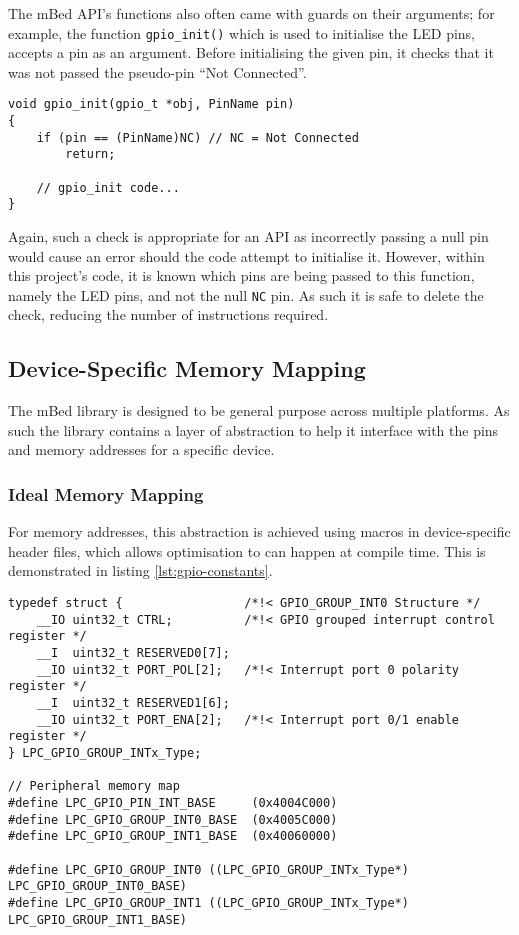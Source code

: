 The mBed API's functions also often came with guards on their arguments; for example, the function \verb|gpio_init()| which is used to initialise the LED pins, accepts a pin as an argument. Before initialising the given pin, it checks that it was not passed the pseudo-pin ``Not Connected''.

\begin{lstlisting}[caption={Argument Guards of gpio init}]
void gpio_init(gpio_t *obj, PinName pin)
{
    if (pin == (PinName)NC) // NC = Not Connected
        return;

    // gpio_init code...
}
\end{lstlisting}

Again, such a check is appropriate for an API as incorrectly passing a null pin would cause an error should the code attempt to initialise it. However, within this project's code, it is known which pins are being passed to this function, namely the LED pins, and not the null \verb|NC| pin. As such it is safe to delete the check, reducing the number of instructions required.

\subsection{Device-Specific Memory Mapping}

The mBed library is designed to be general purpose across multiple platforms. As such the library contains a layer of abstraction to help it interface with the pins and memory addresses for a specific device.

\subsubsection{Ideal Memory Mapping}\label{section:constant-memory-map}

For memory addresses, this abstraction is achieved using macros in device-specific header files, which allows optimisation to can happen at compile time. This is demonstrated in listing \ref{lst:gpio-constants}.

\begin{lstlisting}[caption={Memory spaces mapped in LPC11Uxx.h},label={lst:gpio-constants}]
typedef struct {                 /*!< GPIO_GROUP_INT0 Structure */
    __IO uint32_t CTRL;          /*!< GPIO grouped interrupt control register */
    __I  uint32_t RESERVED0[7];
    __IO uint32_t PORT_POL[2];   /*!< Interrupt port 0 polarity register */
    __I  uint32_t RESERVED1[6];
    __IO uint32_t PORT_ENA[2];   /*!< Interrupt port 0/1 enable register */
} LPC_GPIO_GROUP_INTx_Type;

// Peripheral memory map
#define LPC_GPIO_PIN_INT_BASE     (0x4004C000)
#define LPC_GPIO_GROUP_INT0_BASE  (0x4005C000)
#define LPC_GPIO_GROUP_INT1_BASE  (0x40060000)

#define LPC_GPIO_GROUP_INT0 ((LPC_GPIO_GROUP_INTx_Type*) LPC_GPIO_GROUP_INT0_BASE)
#define LPC_GPIO_GROUP_INT1 ((LPC_GPIO_GROUP_INTx_Type*) LPC_GPIO_GROUP_INT1_BASE)
\end{lstlisting}

